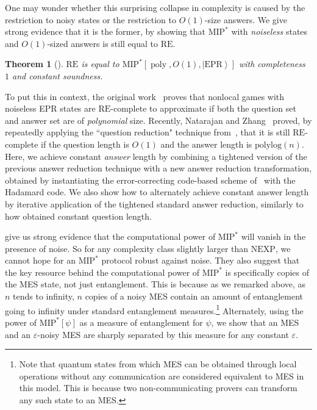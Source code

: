\documentclass[11pt]{article}
\theoremstyle{plain}
\newtheorem{theorem}{Theorem}[section]
\theoremstyle{definition}
\newcommand {\ket} [1] {\ensuremath{ \left| #1 \right\rangle }}
\newcommand{\poly} {\ensuremath{\operatorname{poly}}}
\newcommand{\1}{\mathbb{1}} %
\newcommand{\MIP}{\mathrm{MIP}}
\newcommand{\RE}{\mathrm{RE}}
\newcommand{\NEXP}{\mathrm{NEXP}}
\begin{document}
One may wonder whether this surprising collapse in complexity is caused by the restriction to noisy states or the restriction to $O(1)$-size answers. We give strong evidence that it is the former, by showing that $\MIP^*$ with \emph{noiseless} states and $O(1)$-sized answers is still equal to $\RE$.
\begin{theorem}[]
    \label{thm:informal2}
    $\RE$ is equal to $\MIP^\ast[\poly, O(1),\ket{\mathrm{EPR}}]$ with completeness $1$ and constant soundness.
\end{theorem}
To put this in context, the original work~\cite{JNVWYuen'20,JNVWY'20} proves that nonlocal games with noiseless EPR states are $\mathrm{RE}$-complete to approximate if both the question set and answer set are of \emph{polynomial} size. Recently, Natarajan and Zhang~\cite{10.1145/3564246.3585208} proved, by repeatedly applying the ``question reduction" technique from~\cite{JNVWY'20}, that it is still $\mathrm{RE}$-complete if the question length is $O(1)$ and the answer length is $\mathrm{polylog}(n)$. 
Here, we achieve constant \emph{answer} length by combining a tightened version of the previous answer reduction technique with a new answer reduction transformation, obtained by instantiating the error-correcting code-based scheme of~\cite{neexp} with the Hadamard code. We also show how to alternately achieve constant answer length by iterative application of the tightened standard answer reduction, similarly to how \cite{10.1145/3564246.3585208} obtained constant question length. 


 give us strong evidence that the computational power of $\MIP^*$ will vanish in the presence of noise. 
So for any complexity class slightly larger than $\NEXP$, we cannot hope for an $\MIP^*$ protocol robust against noise.
They also suggest that the key resource behind the computational power of $\MIP^*$ is specifically copies of the MES state, not just entanglement. This is because as we remarked above,
as $n$ tends to infinity, $n$ copies of a noisy MES contain an amount of entanglement going to infinity under standard entanglement measures.\footnote{Note that quantum states from which MES can be obtained through local operations without any communication are considered equivalent to MES in this model. This is because two non-communicating provers can transform any such state to an MES.}
Alternately, using the power of $\MIP^*[\psi]$ as a measure of entanglement for $\psi$, we show that an MES and an $\varepsilon$-noisy MES are sharply separated by this measure for any constant $\varepsilon$.
\end{document}
